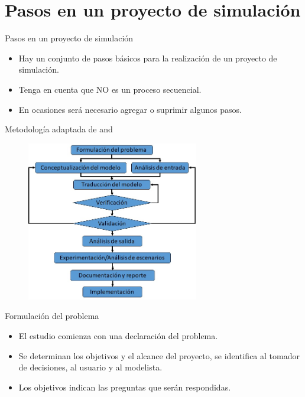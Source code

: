 \section{Pasos en un proyecto de simulación}

\frame{\sectionpage}

\begin{frame}{Pasos en un proyecto de simulación}
    \begin{itemize}
        \item Hay un conjunto de pasos básicos para la realización de un proyecto de simulación.
        \item Tenga en cuenta que NO es un proceso secuencial.
        \item En ocasiones será necesario agregar o suprimir algunos pasos.
    \end{itemize}
\end{frame}

\begin{frame}{Metodología adaptada de \cite{BCN} and \cite{LK}}
    \begin{figure}
        \centering
        \includegraphics[width=7.5cm]{images/Metodologia.jpg}
        \label{fig:metodología}
    \end{figure}
\end{frame}

\begin{frame}{Formulación del problema}
    \begin{itemize}
        \item El estudio comienza con una declaración del problema.
        \item Se determinan los objetivos y el alcance del proyecto, se identifica al tomador de decisiones, al usuario y al modelista.
        \item Los objetivos indican las preguntas que serán respondidas.
    \end{itemize}
\end{frame}

